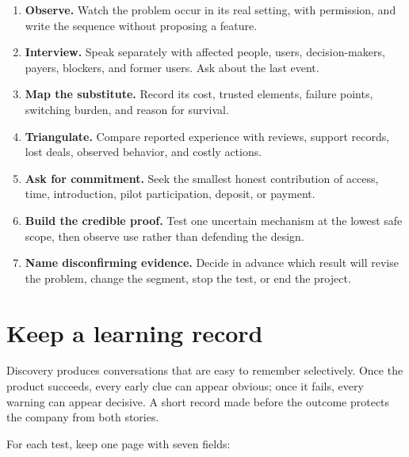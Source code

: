 \begin{enumerate}[itemsep=0.1em,topsep=0.2em]
\item \textbf{Observe.} Watch the problem occur in its real setting, with
  permission, and write the sequence without proposing a feature.
\item \textbf{Interview.} Speak separately with affected people, users,
  decision-makers, payers, blockers, and former users. Ask about the last event.
\item \textbf{Map the substitute.} Record its cost, trusted elements, failure
  points, switching burden, and reason for survival.
\item \textbf{Triangulate.} Compare reported experience with reviews, support
  records, lost deals, observed behavior, and costly actions.
\item \textbf{Ask for commitment.} Seek the smallest honest contribution of
  access, time, introduction, pilot participation, deposit, or payment.
\item \textbf{Build the credible proof.} Test one uncertain mechanism at the
  lowest safe scope, then observe use rather than defending the design.
\item \textbf{Name disconfirming evidence.} Decide in advance which result will
  revise the problem, change the segment, stop the test, or end the project.
\end{enumerate}

\section{Keep a learning record}

Discovery produces conversations that are easy to remember selectively. Once
the product succeeds, every early clue can appear obvious; once it fails, every
warning can appear decisive. A short record made before the outcome protects
the company from both stories.

For each test, keep one page with seven fields:

